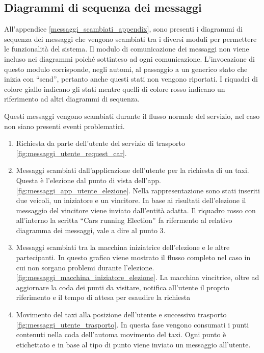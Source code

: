 \subsection{Diagrammi di sequenza dei messaggi}
All'appendice \ref{messaggi_scambiati_appendix}, sono presenti i diagrammi di sequenza dei messaggi che vengono scambiati tra i diversi moduli per permettere le funzionalità del sistema. Il modulo di comunicazione dei messaggi non viene incluso nei diagrammi poiché sottinteso ad ogni comunicazione. L'invocazione di questo modulo corrisponde, negli automi, al passaggio a un generico stato che inizia con ``send'', pertanto anche questi stati non vengono riportati.
I riquadri di colore giallo indicano gli stati mentre quelli di colore rosso indicano un riferimento ad altri diagrammi di sequenza.

Questi messaggi vengono scambiati durante il flusso normale del servizio, nel caso non siano presenti eventi problematici.
\begin{enumerate}	
	\item Richiesta da parte dell'utente del servizio di trasporto \ref{fig:messaggi_utente_request_car}.
	\item Messaggi scambiati dall'applicazione dell'utente per la richiesta di un taxi. Questa è l'elezione dal punto di vista dell'app. \ref{fig:messaggi_app_utente_elezione}. Nella rappresentazione sono stati inseriti due veicoli, un iniziatore e un vincitore. In base ai risultati dell'elezione il messaggio del vincitore viene inviato dall'entità adatta. Il riquadro rosso con all'interno la scritta ``Cars running Election'' fa rifermento al relativo diagramma dei messaggi, vale a dire al punto 3.
	\item Messaggi scambiati tra la macchina iniziatrice dell'elezione e le altre partecipanti. In questo grafico viene mostrato il flusso completo nel caso in cui non sorgano problemi durante l'elezione. \ref{fig:messaggi_macchina_iniziatore_elezione}. La macchina vincitrice, oltre ad aggiornare la coda dei punti da visitare, notifica all'utente il proprio riferimento e il tempo di attesa per esaudire la richiesta
	\item Movimento del taxi alla posizione dell'utente e successivo trasporto \ref{fig:messaggi_utente_trasporto}. In questa fase vengono consumati i punti contenuti nella coda dell'automa movimento del taxi. Ogni punto è etichettato e in base al tipo di punto viene inviato un messaggio all'utente.
\end{enumerate}

